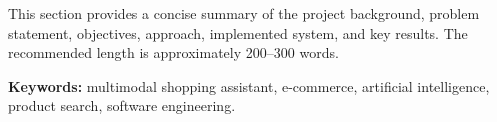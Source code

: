 

This section provides a concise summary of the project background, problem statement, objectives, approach, implemented system, and key results. The recommended length is approximately 200--300 words.

\textbf{Keywords:} multimodal shopping assistant, e-commerce, artificial intelligence, product search, software engineering.
